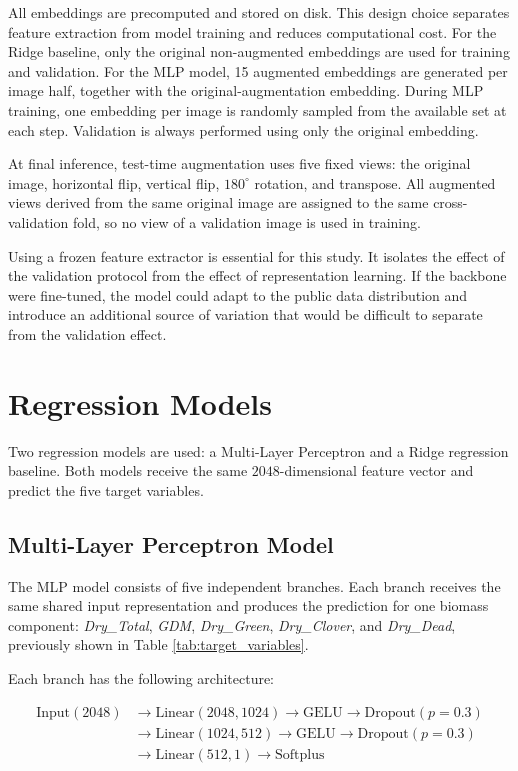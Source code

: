 All embeddings are precomputed and stored on disk. This design choice separates feature extraction from model training and reduces computational cost. For the Ridge baseline, only the original non-augmented embeddings are used for training and validation. For the MLP model, 15 augmented embeddings are generated per image half, together with the original-augmentation embedding. During MLP training, one embedding per image is randomly sampled from the available set at each step. Validation is always performed using only the original embedding.

At final inference, test-time augmentation uses five fixed views: the original image, horizontal flip, vertical flip, $180^\circ$ rotation, and transpose. All augmented views derived from the same original image are assigned to the same cross-validation fold, so no view of a validation image is used in training.

Using a frozen feature extractor is essential for this study. It isolates the effect of the validation protocol from the effect of representation learning. If the backbone were fine-tuned, the model could adapt to the public data distribution and introduce an additional source of variation that would be difficult to separate from the validation effect.

\section{Regression Models}

Two regression models are used: a Multi-Layer Perceptron and a Ridge regression baseline. Both models receive the same $2048$-dimensional feature vector and predict the five target variables.

\subsection{Multi-Layer Perceptron Model}

The MLP model consists of five independent branches. Each branch receives the same shared input representation and produces the prediction for one biomass component: \textit{Dry\_Total}, \textit{GDM}, \textit{Dry\_Green}, \textit{Dry\_Clover}, and \textit{Dry\_Dead}, previously shown in Table \ref{tab:target_variables}.

Each branch has the following architecture:

\[ \begin{aligned} \text{Input}(2048) &\rightarrow \text{Linear}(2048,1024) \rightarrow \text{GELU} \rightarrow \text{Dropout}(p=0.3) \\ &\rightarrow \text{Linear}(1024,512) \rightarrow \text{GELU} \rightarrow \text{Dropout}(p=0.3) \\ &\rightarrow \text{Linear}(512,1) \rightarrow \text{Softplus} \end{aligned} \]

